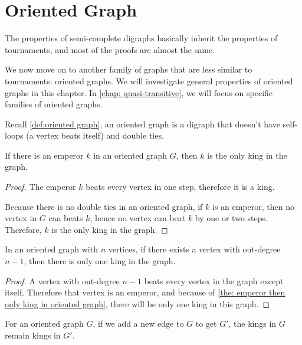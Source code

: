 \chapter{Oriented Graph}\label{chap: general oriented graph}

The properties of semi-complete digraphs basically inherit
the properties of tournaments,
and most of the proofs are almost the same.

We now move on to another family of graphs that are less
similar to tournaments: oriented graphs.
We will investigate general properties of oriented graphs
in this chapter.
In \cref{chap: quasi-transitive}, we will focus on
specific families of oriented graphs.

Recall \cref{def:oriented graph},
an oriented graph is a digraph that doesn't
have self-loops (a vertex beats itself)
and double ties.

\begin{theorem}\label{the: emperor then only king in oriented graph}
  If there is an emperor \(k\) in an oriented graph \(G\),
  then \(k\) is the only king in the graph.
\end{theorem}
\begin{proof}
  The emperor \(k\) beats every vertex in one step,
  therefore it is a king.

  Because there is no double ties in an oriented graph,
  if \(k\) is an emperor,
  then no vertex in \(G\) can beats \(k\),
  hence no vertex can beat \(k\) by one or two steps.
  Therefore, \(k\) is the only king in the graph.
\end{proof}

\begin{corollary}\label{the: if vertex with out-degree n-1 then only one king}
  In an oriented graph with \(n\) vertices,
  if there exists a vertex with out-degree \(n-1\),
  then there is only one king in the graph.
\end{corollary}

\begin{proof}
  A vertex with out-degree \(n-1\) beats every vertex
  in the graph except itself.
  Therefore that vertex is an emperor,
  and because of \cref{the: emperor then only king in oriented graph},
  there will be only one king in this graph.
\end{proof}

\begin{lemma}\label{the: add edge only add king}
  For an oriented graph \(G\),
  if we add a new edge to \(G\) to get \(G'\),
  the kings in \(G\) remain kings in \(G'\).
\end{lemma}

